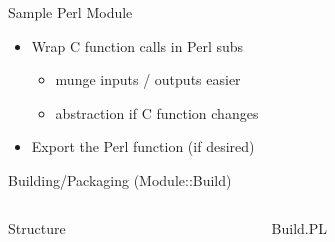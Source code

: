 \documentclass{beamer}
\begin{document}
\begin{frame}{Sample Perl Module}
  \begin{block}{}
    \scriptsize
    
  \end{block}
  \begin{itemize}
    \item Wrap C function calls in Perl subs
    \begin{itemize}
      \item munge inputs / outputs easier
      \item abstraction if C function changes
    \end{itemize}
    \item Export the Perl function (if desired)
  \end{itemize}
\end{frame}

\begin{frame}{Building/Packaging (Module::Build)}
  \begin{columns}
    \begin{column}{0.49\linewidth}
      \begin{block}{Structure}
      \end{block}
      \vspace{4mm}
    \end{column}
    \begin{column}{0.49\linewidth}
      \scriptsize
      \begin{block}{Build.PL}
        
      \end{block}
    \end{column}
  \end{columns}
\end{frame}
\end{document}
